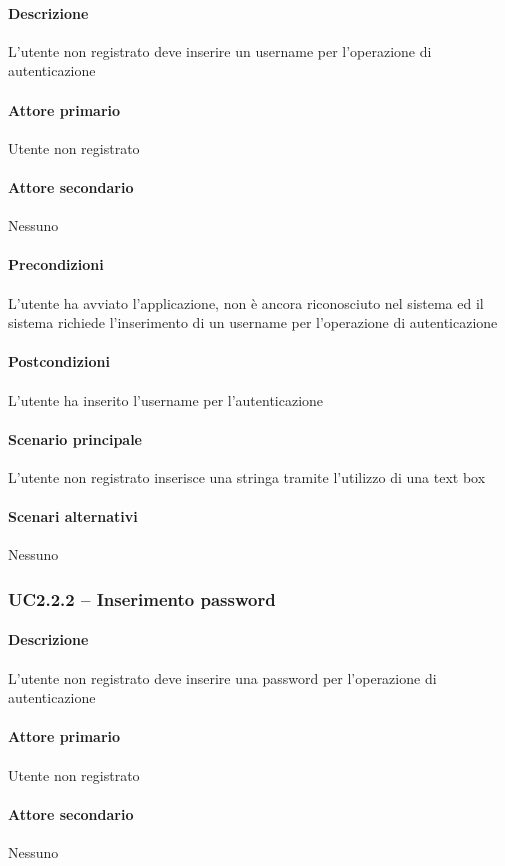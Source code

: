 \paragraph{Descrizione}  L’utente non registrato deve inserire un username per l’operazione di autenticazione
\paragraph{Attore primario}  Utente non registrato
\paragraph{Attore secondario}  Nessuno
\paragraph{Precondizioni}  L’utente ha avviato l’applicazione, non è ancora riconosciuto nel sistema ed il sistema richiede l’inserimento di un username per l’operazione di autenticazione
\paragraph{Postcondizioni}  L’utente ha inserito l’username per l’autenticazione
\paragraph{Scenario principale}  
L’utente non registrato inserisce una stringa tramite l’utilizzo di una text box
\paragraph{Scenari alternativi}  Nessuno



\subsubsection{UC2.2.2 – Inserimento password}
\paragraph{Descrizione}  L’utente non registrato deve inserire una password per l’operazione di autenticazione
\paragraph{Attore primario}  Utente non registrato
\paragraph{Attore secondario}  Nessuno
